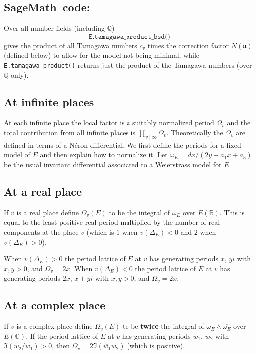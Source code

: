 \documentclass{amsart}
\newcommand{\software}[1]{\textsf{#1}} %
\newcommand{\Sage}{\software{SageMath}{}\ }
\newcommand\Q{\mathbb{Q}}
\newcommand\R{\mathbb{R}}
\newcommand\C{\mathbb{C}}
\begin{document}
\subsection{\Sage code:}\label{sage-4}

Over all number fields (including \(\Q\))
\[
\texttt{E.tamagawa\_product\_bsd()}
\]
gives the product of all Tamagawa numbers \(c_v\) times the correction
factor \(N(\mathfrak{u})\) (defined below) to allow for the model not
being minimal, while \texttt{E.tamagawa\_product()} returns
just the product of the Tamagawa numbers (over \(\Q\) only).

\subsection{At infinite places}\label{at-infinite-places}

At each infinite place the local factor is a suitably normalized period
\(\Omega_v\) and the total contribution from all infinite places is
\(\prod_{v\mid\infty}\Omega_v\). Theoretically the \(\Omega_v\) are
defined in terms of a Néron differential. We first define the periods
for a fixed model of \(E\) and then explain how to normalize it. Let
\(\omega_E = dx/(2y+a_1x+a_3)\) be the usual invariant differential
associated to a Weierstrass model for \(E\).

\subsection{At a real place}\label{at-a-real-place}

If \(v\) is a real place define \(\Omega_v(E)\) to be the integral of
\(\omega_E\) over \(E(\R)\). This is equal to the least positive real
period multiplied by the number of real components at the place \(v\)
(which is \(1\) when \(v(\Delta_E)<0\) and \(2\) when
\(v(\Delta_E)>0\)).

When \(v(\Delta_E)>0\) the period lattice of \(E\) at \(v\) has
generating periods \(x\), \(yi\) with \(x,y>0\), and \(\Omega_v=2x\).
When \(v(\Delta_E)<0\) the period lattice of \(E\) at \(v\) has
generating periods \(2x\), \(x+yi\) with \(x,y>0\), and \(\Omega_v=2x\).

\subsection{At a complex place}\label{at-a-complex-place}

If \(v\) is a complex place define \(\Omega_v(E)\) to be \textbf{twice}
the integral of \(\omega_E\wedge\overline{\omega_E}\) over \(E(\C)\). If
the period lattice of \(E\) at \(v\) has generating periods \(w_1\),
\(w_2\) with \(\Im(w_2/w_1)>0\), then
\(\Omega_v=2\Im(\overline{w_1}w_2)\) (which is positive).
\end{document}
